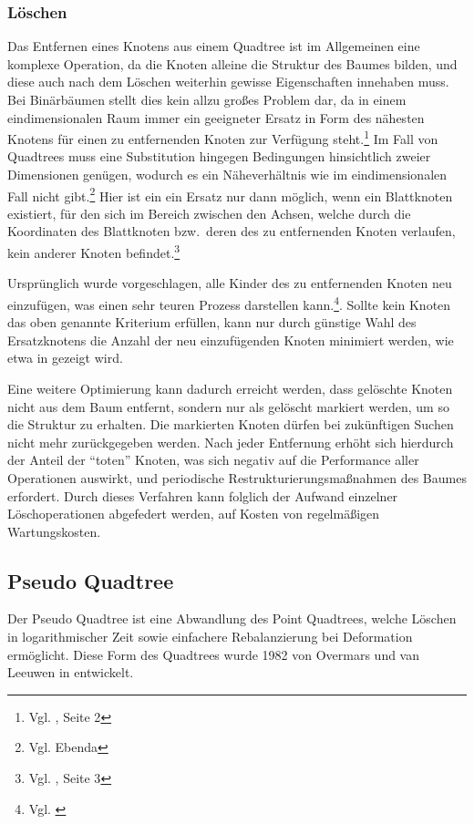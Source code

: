 \documentclass[%
			paper=a4,%
			DIV12,
			draft=false,%
			titlepage
			]{scrartcl}
\newcommand{\zit}[3]{#1 \cite{#2}, #3}
\newcommand{\zitx}[2]{#1 \cite{#2}}
\newcommand{\footzit}[3]{\footnote{\zit{#1}{#2}{#3}}}
\newcommand{\footzitx}[2]{\footnote{\zitx{#1}{#2}}}
\begin{document}
\subsubsection{Löschen}
\label{sec:pointquadtree:delete}
Das Entfernen eines Knotens aus einem Quadtree ist im Allgemeinen eine komplexe Operation, da die Knoten alleine die Struktur des Baumes bilden, und diese auch nach dem Löschen weiterhin gewisse Eigenschaften innehaben muss.
Bei Binärbäumen stellt dies kein allzu großes Problem dar, da in einem eindimensionalen Raum immer ein geeigneter Ersatz in Form des nähesten Knotens für einen zu entfernenden Knoten zur Verfügung steht.\footzit{Vgl.}{DBLP:journals/cacm/Samet80a}{Seite 2}
Im Fall von Quadtrees muss eine Substitution hingegen Bedingungen hinsichtlich zweier Dimensionen genügen, wodurch es ein Näheverhältnis wie im eindimensionalen Fall nicht gibt.\footnote{Vgl. Ebenda}
Hier ist ein ein Ersatz nur dann möglich, wenn ein Blattknoten existiert, für den sich im Bereich zwischen den Achsen, welche durch die Koordinaten des Blattknoten bzw.\ deren des zu entfernenden Knoten verlaufen, kein anderer Knoten befindet.\footzit{Vgl.}{DBLP:journals/cacm/Samet80a}{Seite 3}

Ursprünglich wurde vorgeschlagen, alle Kinder des zu entfernenden Knoten neu einzufügen, was einen sehr teuren Prozess darstellen kann.\footzitx{Vgl.}{DBLP:journals/acta/FinkelB74}.
Sollte kein Knoten das oben genannte Kriterium erfüllen, kann nur durch günstige Wahl des Ersatzknotens die Anzahl der neu einzufügenden Knoten minimiert werden, wie etwa in \cite{DBLP:journals/cacm/Samet80a} gezeigt wird.

Eine weitere Optimierung kann dadurch erreicht werden, dass gelöschte Knoten nicht aus dem Baum entfernt, sondern nur als gelöscht markiert werden, um so die Struktur zu erhalten.
Die markierten Knoten dürfen bei zukünftigen Suchen nicht mehr zurückgegeben werden.
Nach jeder Entfernung erhöht sich hierdurch der Anteil der "`toten"' Knoten, was sich negativ auf die Performance aller Operationen auswirkt, und periodische Restrukturierungsmaßnahmen des Baumes erfordert.
Durch dieses Verfahren kann folglich der Aufwand einzelner Löschoperationen abgefedert werden, auf Kosten von regelmäßigen Wartungskosten.

\subsection{Pseudo Quadtree}
\label{sec:pseudoquadtree}
Der Pseudo Quadtree ist eine Abwandlung des Point Quadtrees, welche Löschen in logarithmischer Zeit sowie einfachere Rebalanzierung bei Deformation ermöglicht. Diese Form des Quadtrees wurde 1982 von Overmars und van Leeuwen in \cite{DBLP:journals/acta/OvermarsL82} entwickelt.
\end{document}
